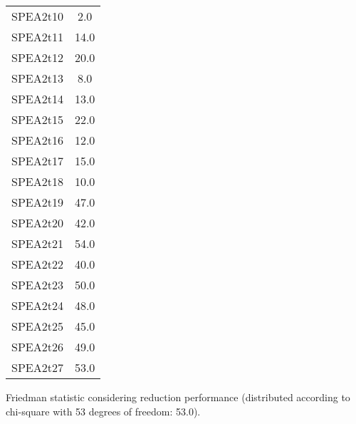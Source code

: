 \documentclass{article}
\begin{document}
\begin{table}[!htp]
\begin{tabular}{c|c}
SPEA2t10&2.0\\
SPEA2t11&14.0\\
SPEA2t12&20.0\\
SPEA2t13&8.0\\
SPEA2t14&13.0\\
SPEA2t15&22.0\\
SPEA2t16&12.0\\
SPEA2t17&15.0\\
SPEA2t18&10.0\\
SPEA2t19&47.0\\
SPEA2t20&42.0\\
SPEA2t21&54.0\\
SPEA2t22&40.0\\
SPEA2t23&50.0\\
SPEA2t24&48.0\\
SPEA2t25&45.0\\
SPEA2t26&49.0\\
SPEA2t27&53.0\\
\end{tabular}
\end{table}


Friedman statistic considering reduction performance (distributed according to chi-square with 53 degrees of freedom: 53.0).
\end{document}
